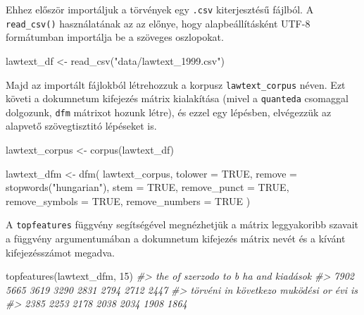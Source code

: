\documentclass[
]{book}
\newenvironment{Shaded}{\begin{snugshade}}{\end{snugshade}}
\newcommand{\AttributeTok}[1]{\textcolor[rgb]{0.77,0.63,0.00}{#1}}
\newcommand{\CommentTok}[1]{\textcolor[rgb]{0.56,0.35,0.01}{\textit{#1}}}
\newcommand{\ConstantTok}[1]{\textcolor[rgb]{0.00,0.00,0.00}{#1}}
\newcommand{\DecValTok}[1]{\textcolor[rgb]{0.00,0.00,0.81}{#1}}
\newcommand{\FunctionTok}[1]{\textcolor[rgb]{0.00,0.00,0.00}{#1}}
\newcommand{\NormalTok}[1]{#1}
\newcommand{\OtherTok}[1]{\textcolor[rgb]{0.56,0.35,0.01}{#1}}
\newcommand{\StringTok}[1]{\textcolor[rgb]{0.31,0.60,0.02}{#1}}
\begin{document}
Ehhez először importáljuk a törvények egy \texttt{.csv} kiterjesztésű
fájlból. A \texttt{read\_csv()} használatának az az előnye, hogy
alapbeállításként UTF-8 formátumban importálja be a szöveges oszlopokat.

\begin{Shaded}
\begin{Highlighting}[]

\NormalTok{lawtext\_df }\OtherTok{\textless{}{-}} \FunctionTok{read\_csv}\NormalTok{(}\StringTok{"data/lawtext\_1999.csv"}\NormalTok{)}
\end{Highlighting}
\end{Shaded}

Majd az importált fájlokból létrehozzuk a korpusz
\texttt{lawtext\_corpus} néven. Ezt követi a dokumnetum kifejezés mátrix
kialakítása (mivel a \texttt{quanteda} csomaggal dolgozunk, \texttt{dfm}
mátrixot hozunk létre), és ezzel egy lépésben, elvégezzük az alapvető
szövegtisztitó lépéseket is.

\begin{Shaded}
\begin{Highlighting}[]

\NormalTok{lawtext\_corpus }\OtherTok{\textless{}{-}} \FunctionTok{corpus}\NormalTok{(lawtext\_df)}

\NormalTok{lawtext\_dfm }\OtherTok{\textless{}{-}} \FunctionTok{dfm}\NormalTok{(}
\NormalTok{  lawtext\_corpus,}
  \AttributeTok{tolower =} \ConstantTok{TRUE}\NormalTok{,}
  \AttributeTok{remove =} \FunctionTok{stopwords}\NormalTok{(}\StringTok{"hungarian"}\NormalTok{),}
  \AttributeTok{stem =} \ConstantTok{TRUE}\NormalTok{,}
  \AttributeTok{remove\_punct =} \ConstantTok{TRUE}\NormalTok{,}
  \AttributeTok{remove\_symbols =} \ConstantTok{TRUE}\NormalTok{,}
  \AttributeTok{remove\_numbers =} \ConstantTok{TRUE}
\NormalTok{)}
\end{Highlighting}
\end{Shaded}

A \texttt{topfeatures} függvény segítségével megnézhetjük a mátrix
leggyakoribb szavait a függvény argumentumában a dokumnetum kifejezés
mátrix nevét és a kívánt kifejezésszámot megadva.

\begin{Shaded}
\begin{Highlighting}[]

\FunctionTok{topfeatures}\NormalTok{(lawtext\_dfm, }\DecValTok{15}\NormalTok{)}
\CommentTok{\#\textgreater{}       the        of  szerzodo        to         b        ha       and  kiadások }
\CommentTok{\#\textgreater{}      7902      5665      3619      3290      2831      2794      2712      2447 }
\CommentTok{\#\textgreater{}   törvéni        in következo  muködési        or       évi        is }
\CommentTok{\#\textgreater{}      2385      2253      2178      2038      2034      1908      1864}
\end{Highlighting}
\end{Shaded}
\end{document}
